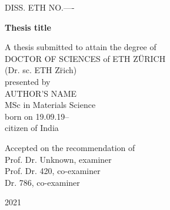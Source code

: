 \begin{titlepage}


\begin{center}
		
{\Large DISS. ETH NO.----}\\
\vspace{2cm}


	{\Large \bfseries Thesis title}
	\vspace{3cm}
	

{\large A thesis submitted to attain the degree of\\
	
	\MakeUppercase{Doctor of sciences} of \MakeUppercase{ETH Z\"urich}\\
	
	(Dr. sc. ETH Z\"rich)\\ 
	
	
	\vspace{2.cm}
	presented by\\
	
	\vspace{.4cm}
	\MakeUppercase{Author's Name}\\
	
	MSc in Materials Science\\\vspace{.4cm}
	born on 19.09.19--\\
	citizen of India\\
	\vspace{3cm}
	
	Accepted on the recommendation of\\\vspace{.6cm}
	Prof. Dr. Unknown, examiner\\
	Prof. Dr. 420, co-examiner\\
	Dr. 786, co-examiner
}
\vfill
2021
\end{center}


\blankpage
\restoregeometry







\end{titlepage}
